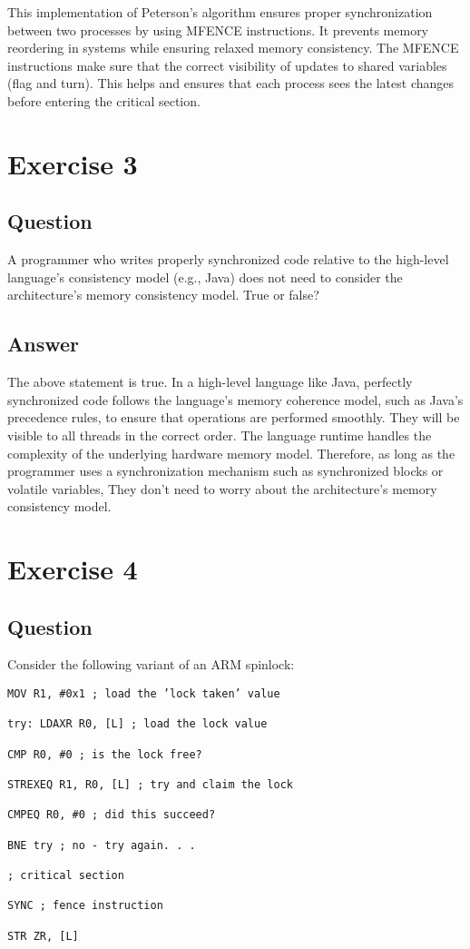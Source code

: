 \documentclass{article}
\begin{document}
This implementation of Peterson's algorithm ensures proper synchronization between two processes by using MFENCE instructions. It prevents memory reordering in systems while ensuring relaxed memory consistency. The MFENCE instructions make sure that the correct visibility of updates to shared variables (flag and turn). This helps and ensures that each process sees the latest changes before entering the critical section.



\section*{Exercise 3}
\subsection*{Question}
A programmer who writes properly synchronized code relative to the high-level language’s consistency model (e.g., Java) does not need to consider the architecture’s memory consistency model. True or false?

\subsection*{Answer}

The above statement is true. In a high-level language like Java, perfectly synchronized code follows the language's memory coherence model, such as Java's precedence rules, to ensure that operations are performed smoothly. They will be visible to all threads in the correct order. The language runtime handles the complexity of the underlying hardware memory model. Therefore, as long as the programmer uses a synchronization mechanism such as synchronized blocks or volatile variables, They don't need to worry about the architecture's memory consistency model.




\section*{Exercise 4}
\subsection*{Question}
Consider the following variant of an ARM spinlock:

\begin{verbatim}
MOV R1, #0x1 ; load the ’lock taken’ value

try: LDAXR R0, [L] ; load the lock value

CMP R0, #0 ; is the lock free?

STREXEQ R1, R0, [L] ; try and claim the lock

CMPEQ R0, #0 ; did this succeed?

BNE try ; no - try again. . .

; critical section

SYNC ; fence instruction

STR ZR, [L]
\end{verbatim}
\end{document}
